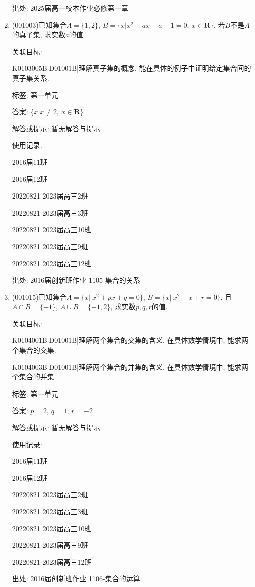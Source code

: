 \documentclass[10pt,a4paper]{article}
\begin{document}
\begin{enumerate}[1.]
出处: 2025届高一校本作业必修第一章
\newpage
\item{ (001003)}已知集合$A=\{1,2\}$, $B=\{x|x^2-ax+a-1=0,\ x\in\mathbf{R}\}$, 若$B$不是$A$的真子集, 求实数$a$的值.


关联目标:

K0103005B|D01001B|理解真子集的概念, 能在具体的例子中证明给定集合间的真子集关系.



标签: 第一单元

答案: $\{x|x\ne 2, \ x\in \mathbf{R}\}$

解答或提示: 暂无解答与提示

使用记录:

2016届11班	

2016届12班	

20220821	2023届高三2班	

20220821	2023届高三3班	

20220821	2023届高三10班	

20220821	2023届高三9班	

20220821	2023届高三12班	


出处: 2016届创新班作业	1105-集合的关系
\newpage
\item{ (001015)}已知集合$A=\{x|\ x^2+px+q=0\}$, $B=\{x|\ x^2-x+r=0\}$, 且$A\cap B=\{-1\}$, $A\cup B=\{-1,2\}$, 求实数$p,q,r$的值.


关联目标:

K0104001B|D01001B|理解两个集合的交集的含义, 在具体数学情境中, 能求两个集合的交集.

K0104003B|D01001B|理解两个集合的并集的含义, 在具体数学情境中, 能求两个集合的并集.



标签: 第一单元

答案: $p=2$, $q=1$, $r=-2$

解答或提示: 暂无解答与提示

使用记录:

2016届11班	

2016届12班	

20220821	2023届高三2班	

20220821	2023届高三3班	

20220821	2023届高三10班	

20220821	2023届高三9班	

20220821	2023届高三12班	


出处: 2016届创新班作业	1106-集合的运算
\end{enumerate}
\end{document}
